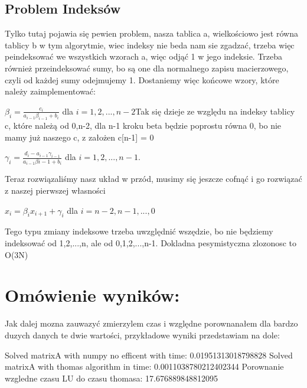 \documentclass[12pt]{article}
\begin{document}
\subsection{Problem Indeksów}
Tylko tutaj pojawia się pewien problem, nasza tablica a, wielkościowo jest równa tablicy b w tym algorytmie, wiec indeksy nie beda nam sie zgadzać, trzeba więc peindeksować we wszystkich wzorach a, więc odjąć 1 w jego indeksie. Trzeba również przeindeksować sumy, bo są one dla normalnego zapisu macierzowego, czyli od każdej sumy odejmujemy 1. Dostaniemy więc końcowe wzory, które należy zaimplementować:
\begin{center}
$\beta_{i} = \frac{c_{i}}{a_{i-1}\beta_{i-1}+b_{i}}$ dla $i=1,2,...,n-2$\newline\newline Tak się dzieje ze względu na indeksy tablicy c, które należą od 0,n-2, dla n-1 kroku beta będzie poprostu równa 0, bo nie mamy już naszego c, z założen c[n-1] = 0
\end{center}
\begin{center}
$\gamma_{i} = \frac{d_{i}-a_{i-1}\gamma_{i-1}}{a_{i-1}\beta{i-1}+b_{i}}$ dla $i=1,2,...,n-1$.\newline\newline
\end{center}
Teraz rozwiązaliśmy nasz układ w przód, musimy się jeszcze cofnąć i go rozwiązać z naszej pierwszej własności 
\begin{center}
$x_{i} = \beta_{i}x_{i+1}+\gamma_{i}$ dla $i = n-2, n-1,...,0$
\end{center}
Tego typu zmiany indeksowe trzeba uwzględnić wszędzie, bo nie będziemy indeksować od 1,2,...,n, ale od 0,1,2,...,n-1.
Dokladna pesymistyczna zlozonosc to O(3N)
\section{Omówienie wyników:}
 
Jak dalej mozna zauwazyć zmierzylem czas i względne porownanałem dla bardzo duzych danych te dwie wartości, przykładowe wyniki przedstawiam na dole:
\begin{center}
Solved matrixA with numpy no efficent with time: 0.01951313018798828
\newline
\newline
Solved matrixA with thomas algorithm in time: 0.0011038780212402344
\newline
\newline
Porownanie wzgledne czasu LU do czasu thomasa:
17.676889848812095
\end{center}
\end{document}

